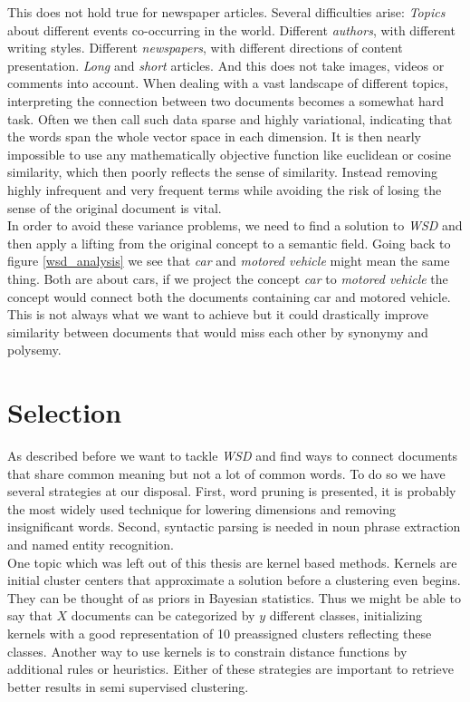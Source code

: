   This does not hold true for newspaper articles. Several difficulties arise: \emph{Topics} about different events co-occurring in the world. Different \emph{authors}, with different writing styles. Different \emph{newspapers}, with different directions of content presentation. \emph{Long} and \emph{short} articles. And this does not take images, videos or comments into account. When dealing with a vast landscape of different topics, interpreting the connection between two documents becomes a somewhat hard task. Often we then call such data sparse and highly variational, indicating that the words span the whole vector space in each dimension. It is then nearly impossible to use any mathematically objective function like euclidean or cosine similarity, which then poorly reflects the sense of similarity. Instead removing highly infrequent and very frequent terms while avoiding the risk of losing the sense of the original document is vital.\\

  In order to avoid these variance problems, we need to find a solution to \emph{WSD} and then apply a lifting from the original concept to a semantic field. Going back to figure \ref{wsd_analysis} we see that \emph{car} and \emph{motored vehicle} might mean the same thing. Both are about cars, if we project the concept \emph{car} to \emph{motored vehicle} the concept would connect both the documents containing car and motored vehicle. This is not always what we want to achieve but it could drastically improve similarity between documents that would miss each other by synonymy and polysemy.

\section{Selection}
\label{sec:selection}

  As described before we want to tackle \emph{WSD} and find ways to connect documents that share common meaning but not a lot of common words. To do so we have several strategies at our disposal. First, word pruning is presented, it is probably the most widely used technique for lowering dimensions and removing insignificant words. Second, syntactic parsing is needed in noun phrase extraction and named entity recognition.\\

  One topic which was left out of this thesis are kernel based methods. Kernels are initial cluster centers that approximate a solution before a clustering even begins. They can be thought of as priors in Bayesian statistics. Thus we might be able to say that $X$ documents can be categorized by $y$ different classes, initializing kernels with a good representation of 10 preassigned clusters reflecting these classes. Another way to use kernels is to constrain distance functions by additional rules or heuristics. Either of these strategies are important to retrieve better results in semi supervised clustering. 

